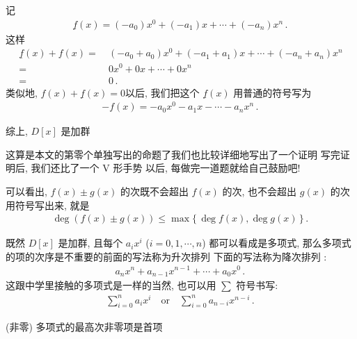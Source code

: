 \begin{pf}
    记
    \begin{align*}
        \underline{f}(x) = (-a_0) x^0 + (-a_1) x + \cdots + (-a_n) x^n \period
    \end{align*}
    这样
    \begin{align*}
        \underline{f}(x) + f(x)
        = \  & (-a_0 + a_0) x^0 + (-a_1 + a_1) x + \cdots + (-a_n + a_n) x^n \\
        = \  & 0 x^0 + 0 x + \cdots + 0 x^n                                  \\
        = \  & 0 \period
    \end{align*}
    类似地, $f(x) + \underline{f}(x) = 0$\period 以后, 我们把这个 $\underline{f}(x)$ 用普通的符号写为
    \begin{align*}
        -f(x) = -a_0 x^0 - a_1 x - \cdots - a_n x^n \period
    \end{align*}

    综上, $D[x]$ 是加群\period
\end{pf}

\begin{remark}
    这算是本文的第零个单独写出的命题了\period 我们也比较详细地写出了一个证明 \period 写完证明后, 我们还比了一个 V 形手势 \period 以后, 每做完一道题就给自己鼓励吧!
\end{remark}

\begin{remark}
    可以看出, $f(x) \pm g(x)$ 的次既不会超出 $f(x)$ 的次, 也不会超出 $g(x)$ 的次\period 用符号写出来, 就是
    \begin{align*}
        \deg (f(x) \pm g(x)) \leq \max \{\, \deg f(x), \deg g(x) \,\} \period
    \end{align*}
\end{remark}

\begin{remark}
    既然 $D[x]$ 是加群, 且每个 $a_i x^i$ ($i = 0,1,\cdots,n$) 都可以看成是多项式, 那么多项式的项的次序是不重要的\period 前面的写法称为升次排列 \period 下面的写法称为降次排列 :
    \begin{align*}
        a_n x^n + a_{n-1} x^{n-1} + \cdots + a_0 x^0 \period
    \end{align*}
    这跟中学里接触的多项式是一样的\period 当然, 也可以用 $\sum$ 符号书写:
    \begin{align*}
        \sum_{i = 0}^{n} a_i x^i \quad \text{or} \quad \sum_{i = 0}^{n} a_{n-i} x^{n-i} \period
    \end{align*}

    (非零) 多项式的最高次非零项是首项 \period
\end{remark}

